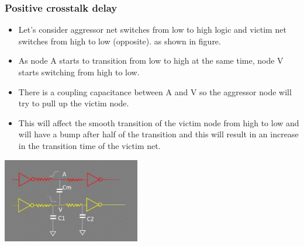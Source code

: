 \documentclass{beamer}
\begin{document}
	\begin{frame}
	\frametitle{Positive crosstalk delay}
	\begin{itemize}
		\item Let’s consider aggressor net switches from low to high logic and victim net switches from high to low (opposite). as shown in figure.
		\item As node A starts to transition from low to high at the same time, node V starts switching from high to low.
		\item There is a coupling capacitance between A and V so the aggressor node will try to pull up the victim node.
		\item This will affect the smooth transition of the victim node from high to low and will have a bump after half of the transition and this will result in an increase in the transition time of the victim net.
	\end{itemize}
	\begin{center}
		\includegraphics[width=0.45\textwidth]{crosstalkDelay1}
	\end{center}
\end{frame}
\end{document}
